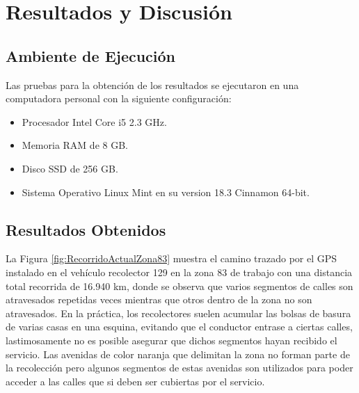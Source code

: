 \chapter{Resultados y Discusión}
\label{resultadosdiscusion}
\ifpdf
  \graphicspath{{Chapter7/Chapter7Figs/PNG/}{Chapter7/Chapter7Figs/PDF/}{Chapter7/Chapter7Figs/}}
\else
  \graphicspath{{Chapter7/Chapter7Figs/EPS/}{Chapter7/Chapter7Figs/}}
\fi


\section{Ambiente de Ejecución}

Las pruebas para la obtención de los resultados se ejecutaron en una computadora personal con la siguiente configuración:
\begin{itemize}
   \item Procesador Intel\textcopyright{}  Core\texttrademark{} i5 2.3 GHz.
    \item Memoria RAM de 8 GB. 
    \item Disco SSD de 256 GB.
    \item Sistema Operativo Linux Mint en su version 18.3 Cinnamon 64-bit.
\end{itemize}



\section{Resultados Obtenidos}


La Figura \ref{fig:RecorridoActualZona83} muestra el camino trazado por el GPS instalado en el vehículo recolector 129 en la zona 83 de trabajo con una distancia total recorrida de 16.940 km, donde se observa que varios segmentos de calles son atravesados repetidas veces mientras que otros dentro de la zona no son atravesados. En la práctica, los recolectores suelen acumular las bolsas de basura de varias casas en una esquina, evitando que el conductor entrase a ciertas calles, lastimosamente no es posible asegurar que dichos segmentos hayan recibido el servicio. Las avenidas de color naranja que delimitan la zona no forman parte de la recolección pero algunos segmentos de estas avenidas son utilizados para poder acceder a las calles que si deben ser cubiertas por el servicio.


